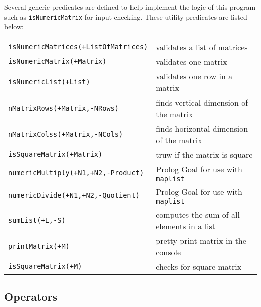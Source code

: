 \documentclass[a4paper]{article}
\begin{document}
Several generic predicates are defined to help implement the logic of this program such as \texttt{isNumericMatrix} for input checking. These utility predicates are listed below:
\begin{center}
\begin{tabular}{ l l }
 \texttt{isNumericMatrices(+ListOfMatrices)} & validates a list of matrices \\ 
 \texttt{isNumericMatrix(+Matrix)} & validates one matrix \\ 
 \texttt{isNumericList(+List)} & validates one row in a matrix \\ 
 \texttt{nMatrixRows(+Matrix,-NRows)} & finds vertical dimension of the matrix \\ 
 \texttt{nMatrixColss(+Matrix,-NCols)} & finds horizontal dimension of the matrix \\ 
 \texttt{isSquareMatrix(+Matrix)} & truw if the matrix is square \\ 
 \texttt{numericMultiply(+N1,+N2,-Product)} & Prolog Goal for use with \texttt{maplist} \\ 
 \texttt{numericDivide(+N1,+N2,-Quotient)} & Prolog Goal for use with \texttt{maplist} \\ 
 \texttt{sumList(+L,-S)} & computes the sum of all elements in a list \\ 
 \texttt{printMatrix(+M)} & pretty print matrix in the console \\ 
 \texttt{isSquareMatrix(+M)} & checks for square matrix \\ 
\end{tabular}
\end{center}


\subsection{Operators}
\end{document}
